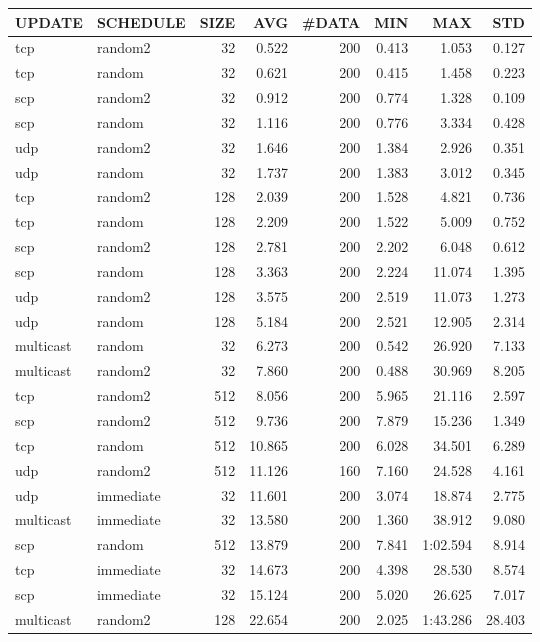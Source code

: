 \begin{tabular}{|l|l|r|r|r|r|r|r|}
\hline
UPDATE & SCHEDULE & SIZE & AVG & \#DATA & MIN & MAX & STD\\
\hline
tcp & random2 & 32 & 0.522 & 200 & 0.413 & 1.053 & 0.127\\
tcp & random & 32 & 0.621 & 200 & 0.415 & 1.458 & 0.223\\
scp & random2 & 32 & 0.912 & 200 & 0.774 & 1.328 & 0.109\\
scp & random & 32 & 1.116 & 200 & 0.776 & 3.334 & 0.428\\
udp & random2 & 32 & 1.646 & 200 & 1.384 & 2.926 & 0.351\\
udp & random & 32 & 1.737 & 200 & 1.383 & 3.012 & 0.345\\
tcp & random2 & 128 & 2.039 & 200 & 1.528 & 4.821 & 0.736\\
tcp & random & 128 & 2.209 & 200 & 1.522 & 5.009 & 0.752\\
scp & random2 & 128 & 2.781 & 200 & 2.202 & 6.048 & 0.612\\
scp & random & 128 & 3.363 & 200 & 2.224 & 11.074 & 1.395\\
udp & random2 & 128 & 3.575 & 200 & 2.519 & 11.073 & 1.273\\
udp & random & 128 & 5.184 & 200 & 2.521 & 12.905 & 2.314\\
multicast & random & 32 & 6.273 & 200 & 0.542 & 26.920 & 7.133\\
multicast & random2 & 32 & 7.860 & 200 & 0.488 & 30.969 & 8.205\\
tcp & random2 & 512 & 8.056 & 200 & 5.965 & 21.116 & 2.597\\
scp & random2 & 512 & 9.736 & 200 & 7.879 & 15.236 & 1.349\\
tcp & random & 512 & 10.865 & 200 & 6.028 & 34.501 & 6.289\\
udp & random2 & 512 & 11.126 & 160 & 7.160 & 24.528 & 4.161\\
udp & immediate & 32 & 11.601 & 200 & 3.074 & 18.874 & 2.775\\
multicast & immediate & 32 & 13.580 & 200 & 1.360 & 38.912 & 9.080\\
scp & random & 512 & 13.879 & 200 & 7.841 & 1:02.594 & 8.914\\
tcp & immediate & 32 & 14.673 & 200 & 4.398 & 28.530 & 8.574\\
scp & immediate & 32 & 15.124 & 200 & 5.020 & 26.625 & 7.017\\
multicast & random2 & 128 & 22.654 & 200 & 2.025 & 1:43.286 & 28.403\\

\end{tabular}
